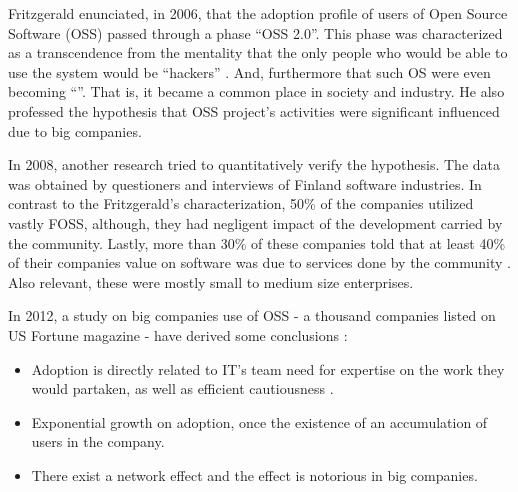 \documentclass[
12pt,				%
openright,			%
oneside,			%
a4paper,			%
brazil,				%
english,			%
]{abntex2}
\begin{document}
Fritzgerald enunciated, in 2006, that the adoption profile of users of
Open Source Software (OSS) passed through a phase ``OSS 2.0''. This
phase was characterized as a transcendence from the mentality that the
only people who would be able to use the system would be ``hackers''
\cite{fitzgerald2006transformation}. And, furthermore that such OS
were even becoming ``''. That is, it became a common
place in society and industry. He also professed the hypothesis that
OSS project's activities were significant influenced due to big companies. 

In 2008, another research tried to quantitatively verify the
hypothesis. The data was obtained by questioners and interviews of
Finland software industries. In contrast to the Fritzgerald's
characterization, 50\% of the companies utilized vastly FOSS,
although, they had negligent impact of the development carried by the
community. Lastly, more than 30\% of these companies told that at
least 40\% of their companies value on software was due to services
done by the community \cite{hauge2008adoption}. Also relevant, these
were mostly small to medium size enterprises.    

In 2012, a study on big companies use of OSS - a thousand companies listed on US
Fortune magazine - have derived some conclusions \cite{spinellis2012organizational}: 
\begin{itemize}
\item Adoption is directly related to IT's team need for expertise on
  the work they would partaken, as well as efficient cautiousness \cite{gallego2015open,
 li2013all}.
\item Exponential growth on adoption, once the existence of an
  accumulation of users in the company. 
\item There exist a network effect and the effect is notorious in big companies.  
\end{itemize}
\end{document}
